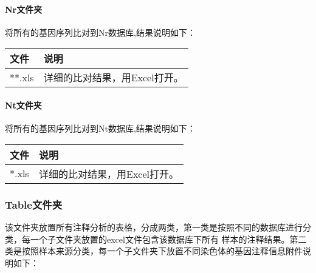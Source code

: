 \paragraph{Nr文件夹}
将所有的基因序列比对到Nr数据库,结果说明如下：
\begin{table}[H]
        \begin{center}
            \begin{threeparttable}
                \begin{tabularx}{\textwidth}{XX}

                    \toprule
                    \bfseries{文件}                  &\bfseries{说明}\\
                    \midrule
                    **.xls                 &详细的比对结果，用Excel打开。\\

                    \bottomrule

                \end{tabularx}

            \end{threeparttable}
        \end{center}
\end{table}

\paragraph{Nt文件夹}
将所有的基因序列比对到Nt数据库,结果说明如下：
\begin{table}[H]
        \begin{center}
            \begin{threeparttable}
                \begin{tabularx}{\textwidth}{XX}

                    \toprule
                    \bfseries{文件}                  &\bfseries{说明}\\
                    \midrule
                    *.xls                           &详细的比对结果，用Excel打开。\\
                    \bottomrule

                \end{tabularx}

            \end{threeparttable}
        \end{center}
\end{table}

\subsubsection{Table文件夹}
该文件夹放置所有注释分析的表格，分成两类，第一类是按照不同的数据库进行分类，每一个子文件夹放置的excel文件包含该数据库下所有
样本的注释结果。第二类是按照样本来源分类，每一个子文件夹下放置不同染色体的基因注释信息附件说明如下：


